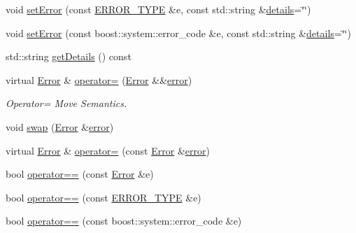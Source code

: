 \begin{DoxyCompactItemize}
void \hyperlink{classshaan97_1_1sync_1_1_error_abd07d5a3c98e8310160b1c13b1b08049}{set\+Error} (const \hyperlink{namespaceshaan97_1_1sync_a69f4d5572314be52626f6a1c8ecc8db9}{E\+R\+R\+O\+R\+\_\+\+T\+Y\+PE} \&e, const std\+::string \&\hyperlink{classshaan97_1_1sync_1_1_error_a92edb57631c4d7a2f0177f3440111b23}{details}=\char`\"{}\char`\"{})
\item 
void \hyperlink{classshaan97_1_1sync_1_1_error_a6be9dc27fe05da94cdc58fb1e5256e87}{set\+Error} (const boost\+::system\+::error\+\_\+code \&e, const std\+::string \&\hyperlink{classshaan97_1_1sync_1_1_error_a92edb57631c4d7a2f0177f3440111b23}{details}=\char`\"{}\char`\"{})
\item 
std\+::string \hyperlink{classshaan97_1_1sync_1_1_error_a4a805cbe2bd0fb6c3288b7c369f4de61}{get\+Details} () const
\item 
virtual \hyperlink{classshaan97_1_1sync_1_1_error}{Error} \& \hyperlink{classshaan97_1_1sync_1_1_error_aad15762ad2a2e477bcad5e4e0e0f0ca3}{operator=} (\hyperlink{classshaan97_1_1sync_1_1_error}{Error} \&\&\hyperlink{classshaan97_1_1sync_1_1_error_ab84e9af061261009996c1297c5cad5bd}{error})
\begin{DoxyCompactList}\small\item\em Operator= Move Semantics. \end{DoxyCompactList}\item 
void \hyperlink{classshaan97_1_1sync_1_1_error_a84312ccc3b0eecd63945df4b2c7654a0}{swap} (\hyperlink{classshaan97_1_1sync_1_1_error}{Error} \&\hyperlink{classshaan97_1_1sync_1_1_error_ab84e9af061261009996c1297c5cad5bd}{error})
\item 
virtual \hyperlink{classshaan97_1_1sync_1_1_error}{Error} \& \hyperlink{classshaan97_1_1sync_1_1_error_aca9e61b98143dd11af5ddc20e8585641}{operator=} (const \hyperlink{classshaan97_1_1sync_1_1_error}{Error} \&\hyperlink{classshaan97_1_1sync_1_1_error_ab84e9af061261009996c1297c5cad5bd}{error})
\item 
bool \hyperlink{group___syntactic_sugar_ga54d9f727bc1777cb9485765b070f0f97}{operator==} (const \hyperlink{classshaan97_1_1sync_1_1_error}{Error} \&e)
\item 
bool \hyperlink{group___syntactic_sugar_gaece1c258e0e4bcfba00769313c8370ad}{operator==} (const \hyperlink{namespaceshaan97_1_1sync_a69f4d5572314be52626f6a1c8ecc8db9}{E\+R\+R\+O\+R\+\_\+\+T\+Y\+PE} \&e)
\item 
bool \hyperlink{group___syntactic_sugar_ga46d610d78d061c030e562563f947e196}{operator==} (const boost\+::system\+::error\+\_\+code \&e)
\item 

\end{DoxyCompactItemize}
